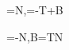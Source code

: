 =\kappa\mathbf N,\qquad {}=-\kappa\mathbf T+\tau\mathbf B

=-\tau\mathbf N,\qquad \mathbf B=\mathbf T\times\mathbf N
